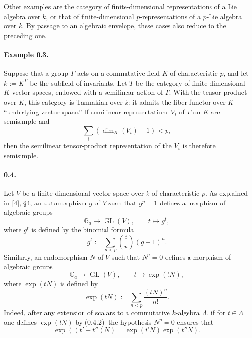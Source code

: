 \documentclass[11pt]{article}
\newcommand{\Ga}{\mathbb{G}_a}
\newcommand{\GL}{\operatorname{GL}}
\theoremstyle{plain}
\theoremstyle{definition}
\begin{document}
Other examples are the category of finite-dimensional representations of a Lie algebra over $k$, or that of finite-dimensional $p$-representations of a $p$-Lie algebra over $k$. By passage to an algebraic envelope, these cases also reduce to the preceding one.

\paragraph{Example 0.3.} Suppose that a group $\Gamma$ acts on a commutative field $K$ of characteristic $p$, and let $k:=K^\Gamma$ be the subfield of invariants. Let $T$ be the category of finite-dimensional $K$-vector spaces, endowed with a semilinear action of $\Gamma$. With the tensor product over $K$, this category is Tannakian over $k$: it admits the fiber functor over $K$ ``underlying vector space.'' If semilinear representations $V_i$ of $\Gamma$ on $K$ are semisimple and
\[
   \sum_i(\dim_K(V_i)-1)<p,
\]
then the semilinear tensor-product representation of the $V_i$ is therefore semisimple.

\paragraph{0.4.} Let $V$ be a finite-dimensional vector space over $k$ of characteristic $p$. As explained in [4], \S4, an automorphism $g$ of $V$ such that $g^p=1$ defines a morphism of algebraic groups
\[
   \Ga\longrightarrow \GL(V),\qquad t\longmapsto g^t,
\]
where $g^t$ is defined by the binomial formula
\begin{equation}\tag{0.4.1}
   g^t:=\sum_{n<p}{t\choose n}(g-1)^n.
\end{equation}
Similarly, an endomorphism $N$ of $V$ such that $N^p=0$ defines a morphism of algebraic groups
\[
   \Ga\longrightarrow \GL(V),\qquad t\longmapsto \exp(tN),
\]
where $\exp(tN)$ is defined by
\begin{equation}\tag{0.4.2}
   \exp(tN):=\sum_{n<p}\frac{(tN)^n}{n!}.
\end{equation}
Indeed, after any extension of scalars to a commutative $k$-algebra $\Lambda$, if for $t\in\Lambda$ one defines $\exp(tN)$ by (0.4.2), the hypothesis $N^p=0$ ensures that
\[
   \exp((t'+t'')N)=\exp(t'N)\exp(t''N).
\]
\end{document}

